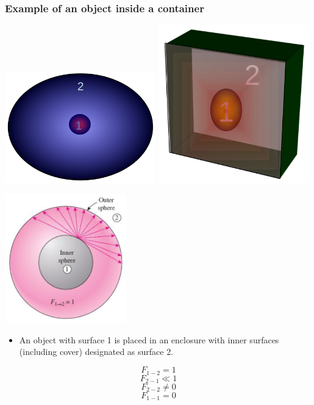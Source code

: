 \documentclass[11pt]{article}
\begin{document}
\subsubsection{Example of an object inside a container}
\label{sec:org872631c}
\begin{center}
\includegraphics[width=0.49\textwidth]{./images/view-factor-object-inside-a-spherical-container-example-diagram.png}
\includegraphics[width=0.49\textwidth]{./images/view-factor-object-inside-a-rectangular-container-example-diagram.png}
\end{center}
\begin{center}
\includegraphics[height=15em]{./images/view-factor-object-inside-a-spherical-container-example-detailed-diagram.png}
\end{center}
\begin{itemize}
\item An object with surface 1 is placed in an enclosure with inner surfaces (including cover) designated as surface 2.
\end{itemize}
\[F_{1-2} = 1\]
\[F_{2-1} \ll 1\]
\[F_{2-2} \ne 0\]
\[F_{1-1} = 0\]
\end{document}
